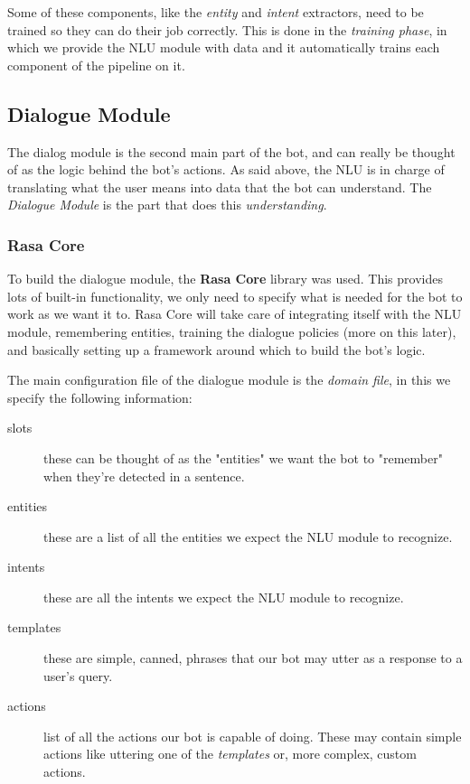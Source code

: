 \documentclass[11pt,a4paper]{article}
\begin{document}
			Some of these components, like the \textit{entity} and \textit{intent} extractors, need to be trained so they can do their job correctly. This is done in the \textit{training phase}, in which we provide the NLU module with data and it automatically trains each component of the pipeline on it.


	\subsection{Dialogue Module}
	\label{ssec-dialogue-module}
		
		The dialog module is the second main part of the bot, and can really be thought of as the logic behind the bot's actions. As said above, the NLU is in charge of translating what the user means into data that the bot can understand. The \textit{Dialogue Module} is the part that does this \textit{understanding}.
		
		
		\subsubsection{Rasa Core}
		\label{ssec-rasa-core}	
		
			To build the dialogue module, the \textbf{Rasa Core} \cite{rasacore} library was used. This provides lots of built-in functionality, we only need to specify what is needed for the bot to work as we want it to. Rasa Core will take care of integrating itself with the NLU module, remembering entities, training the dialogue policies (more on this later), and basically setting up a framework around which to build the bot's logic. 
			
			The main configuration file of the dialogue module is the \textit{domain file}, in this we specify the following information:
			
			\begin{description}
				\item[slots] these can be thought of as the "entities" we want the bot to "remember" when they're detected in a sentence.
				\item[entities] these are a list of all the entities we expect the NLU module to recognize.
				\item[intents] these are all the intents we expect the NLU module to recognize.
				\item[templates] these are simple, canned, phrases that our bot may utter as a response to a user's query.
				\item[actions] list of all the actions our bot is capable of doing. These may contain simple actions like uttering one of the \textit{templates} or, more complex, custom actions.
			\end{description}
			
\end{document}
